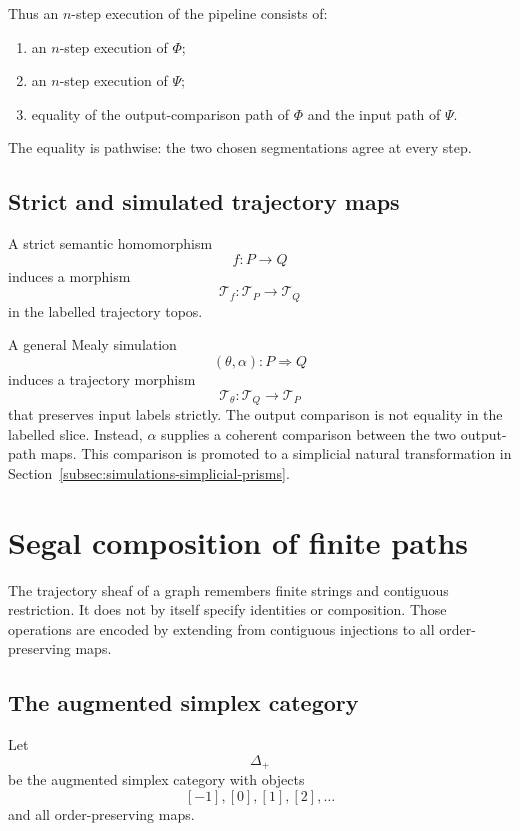 Thus an \(n\)-step execution of the pipeline consists of:
\begin{enumerate}
    \item an \(n\)-step execution of \(\Phi\);
    \item an \(n\)-step execution of \(\Psi\);
    \item equality of the output-comparison path of \(\Phi\) and the input
    path of \(\Psi\).
\end{enumerate}
The equality is pathwise: the two chosen segmentations agree at every step.

\subsection{Strict and simulated trajectory maps}
\label{subsec:strict-simulated-trajectory-maps}

A strict semantic homomorphism
\[
    f:P\to Q
\]
induces a morphism
\[
    \mathscr T_f:
    \mathscr T_P\to\mathscr T_Q
\]
in the labelled trajectory topos.

A general Mealy simulation
\[
    (\theta,\alpha):P\Longrightarrow Q
\]
induces a trajectory morphism
\[
    \mathscr T_\theta:
    \mathscr T_Q\to\mathscr T_P
\]
that preserves input labels strictly. The output comparison is not equality
in the labelled slice. Instead, \(\alpha\) supplies a coherent comparison
between the two output-path maps. This comparison is promoted to a
simplicial natural transformation in
Section~\ref{subsec:simulations-simplicial-prisms}.

\section{Segal composition of finite paths}
\label{sec:segal-composition-finite-paths}

The trajectory sheaf of a graph remembers finite strings and contiguous
restriction. It does not by itself specify identities or composition. Those
operations are encoded by extending from contiguous injections to all
order-preserving maps.

\subsection{The augmented simplex category}
\label{subsec:augmented-simplex-category}

Let
\[
    \Delta_+
\]
be the augmented simplex category with objects
\[
    [-1],[0],[1],[2],\ldots
\]
and all order-preserving maps.

